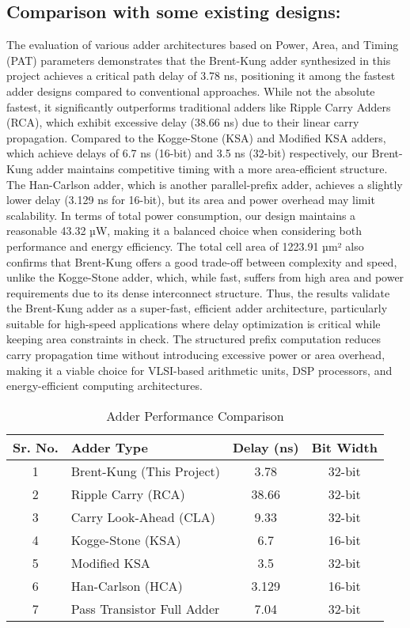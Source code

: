 \documentclass{IEEEtran}
\begin{document}
\subsection{Comparison with some existing designs:}
The evaluation of various adder architectures based on Power, Area, and Timing (PAT) parameters demonstrates that the Brent-Kung adder synthesized in this project achieves a critical path delay of 3.78 ns, positioning it among the fastest adder designs compared to conventional approaches. While not the absolute fastest, it significantly outperforms traditional adders like Ripple Carry Adders (RCA), which exhibit excessive delay (38.66 ns) due to their linear carry propagation.
Compared to the Kogge-Stone (KSA) and Modified KSA adders, which achieve delays of 6.7 ns (16-bit) and 3.5 ns (32-bit) respectively, our Brent-Kung adder maintains competitive timing with a more area-efficient structure. The Han-Carlson adder, which is another parallel-prefix adder, achieves a slightly lower delay (3.129 ns for 16-bit), but its area and power overhead may limit scalability.
In terms of total power consumption, our design maintains a reasonable 43.32 µW, making it a balanced choice when considering both performance and energy efficiency. The total cell area of 1223.91 µm² also confirms that Brent-Kung offers a good trade-off between complexity and speed, unlike the Kogge-Stone adder, which, while fast, suffers from high area and power requirements due to its dense interconnect structure.
Thus, the results validate the Brent-Kung adder as a super-fast, efficient adder architecture, particularly suitable for high-speed applications where delay optimization is critical while keeping area constraints in check. The structured prefix computation reduces carry propagation time without introducing excessive power or area overhead, making it a viable choice for VLSI-based arithmetic units, DSP processors, and energy-efficient computing architectures.\\

\begin{table}[h]
    \centering
    \renewcommand{\arraystretch}{1.2} %
    \begin{tabular}{|c|l|c|c|}
        \hline
        \textbf{Sr. No.} & \textbf{Adder Type} & \textbf{Delay (ns)} & \textbf{Bit Width} \\ \hline
        1 & Brent-Kung (This Project) & 3.78 & 32-bit \\ 
        2 & Ripple Carry (RCA) & 38.66 & 32-bit \\ 
        3 & Carry Look-Ahead (CLA) & 9.33 & 32-bit \\ 
        4 & Kogge-Stone (KSA) & 6.7 & 16-bit \\ 
        5 & Modified KSA & 3.5 & 32-bit \\ 
        6 & Han-Carlson (HCA) & 3.129 & 16-bit \\ 
        7 & Pass Transistor Full Adder & 7.04 & 32-bit \\ \hline
    \end{tabular}
    \caption{Adder Performance Comparison}
    \label{tab:adder_performance}
\end{table}
\end{document}
